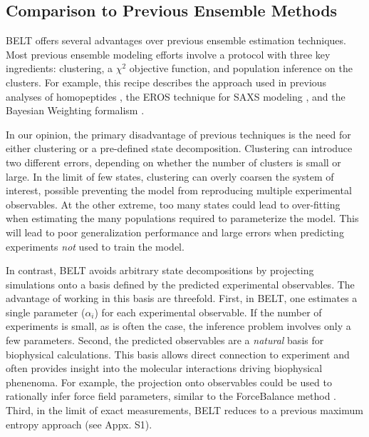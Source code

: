 \documentclass[11pt,titlepage]{article}
\begin{document}
\subsection*{Comparison to Previous Ensemble Methods}

BELT offers several advantages over previous ensemble estimation techniques.  Most previous ensemble modeling efforts involve a protocol with three key ingredients: clustering, a $\chi^2$ objective function, and population inference on the clusters.  For example, this recipe describes the approach used in previous analyses of homopeptides \citep{Graf2007}, the EROS technique for SAXS modeling \citep{rozycki2011saxs}, and the Bayesian Weighting formalism \citep{fisher2010}.  

In our opinion, the primary disadvantage of previous techniques is the need for either clustering or a pre-defined state decomposition.  Clustering can introduce two different errors, depending on whether the number of clusters is small or large.  In the limit of few states, clustering can overly coarsen the system of interest, possible preventing the model from reproducing multiple experimental observables.  At the other extreme, too many states could lead to over-fitting when estimating the many populations required to parameterize the model.  This will lead to poor 
generalization performance and large errors when predicting experiments \emph{not} used to train the model.  

In contrast, BELT avoids arbitrary state decompositions by projecting simulations onto a basis defined by the predicted experimental observables.  The advantage of working in this basis are threefold. First, in BELT, one estimates a single parameter ($\alpha_i$) for each experimental observable.  If the number of experiments is small, as is often the case, the inference problem involves only a few parameters.  Second, the predicted observables are a \emph{natural} basis for biophysical calculations.  This basis allows direct connection to experiment and often provides insight into the molecular interactions driving biophysical phenenoma.  For example, the projection onto observables could be used to rationally infer force field parameters, similar to the ForceBalance method \citep{wang2012, wang2013systematic}.  Third, in the limit of exact measurements, BELT reduces to a previous \citep{chodera2012} maximum entropy approach (see Appx. S1).  
\end{document}
